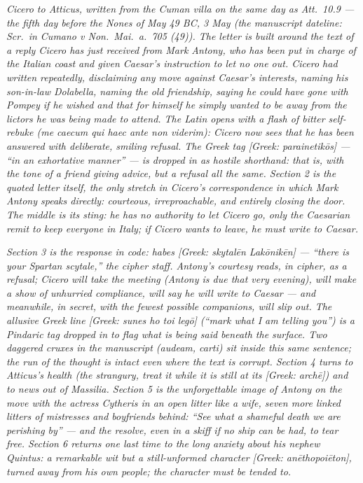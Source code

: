 
\textit{Cicero to Atticus, written from the Cuman villa
on the same day as Att.\ 10.9 --- the fifth day before
the Nones of May 49 BC, 3 May (the manuscript dateline:
\textit{Scr.\ in Cumano v Non.\ Mai.\ a.\ 705 (49)}). The
letter is built around the text of a reply Cicero has
just received from Mark Antony, who has been put in
charge of the Italian coast and given Caesar's instruction
to let no one out. Cicero had written repeatedly,
disclaiming any move against Caesar's interests, naming
his son-in-law Dolabella, naming the old friendship,
saying he could have gone with Pompey if he wished and
that for himself he simply wanted to be away from the
lictors he was being made to attend. The Latin opens
with a flash of bitter self-rebuke (\textit{me caecum
qui haec ante non viderim}): Cicero now sees that he
has been answered with deliberate, smiling refusal.
The Greek tag \textit{[Greek: parainetik\=os]} ---
``in an exhortative manner'' --- is dropped in as
hostile shorthand: that is, with the tone of a friend
giving advice, but a refusal all the same. Section 2 is
the quoted letter itself, the only stretch in Cicero's
correspondence in which Mark Antony speaks directly:
courteous, irreproachable, and entirely closing the
door. The middle is its sting: he has no authority to
let Cicero go, only the Caesarian remit to keep
everyone in Italy; if Cicero wants to leave, he must
write to Caesar.}

\textit{Section 3 is the response in code: \textit{habes
\textit{[Greek: skytal\=en Lak\=onik\=en]}} --- ``there
is your Spartan scytale,'' the cipher staff. Antony's
courtesy reads, in cipher, as a refusal; Cicero will
take the meeting (Antony is due that very evening),
will make a show of unhurried compliance, will say he
will write to Caesar --- and meanwhile, in secret, with
the fewest possible companions, will slip out. The
allusive Greek line \textit{[Greek: sunes ho toi
leg\=o]} (``mark what I am telling you'') is a
Pindaric tag dropped in to flag what is being said
beneath the surface. Two daggered cruxes in the
manuscript (\dag{}audeam\dag{}, \dag{}carti\dag{}) sit
inside this same sentence; the run of the thought is
intact even where the text is corrupt. Section 4 turns
to Atticus's health (the strangury, treat it while it
is still at its \textit{[Greek: arch\=e]}) and to news
out of Massilia. Section 5 is the unforgettable image
of Antony on the move with the actress Cytheris in an
open litter like a wife, seven more linked litters of
mistresses and boyfriends behind: ``See what a shameful
death we are perishing by'' --- and the resolve, even
in a skiff if no ship can be had, to tear free. Section
6 returns one last time to the long anxiety about his
nephew Quintus: a remarkable wit but a still-unformed
character \textit{[Greek: an\=ethopoi\=eton]}, turned
away from his own people; the character must be tended
to.}
